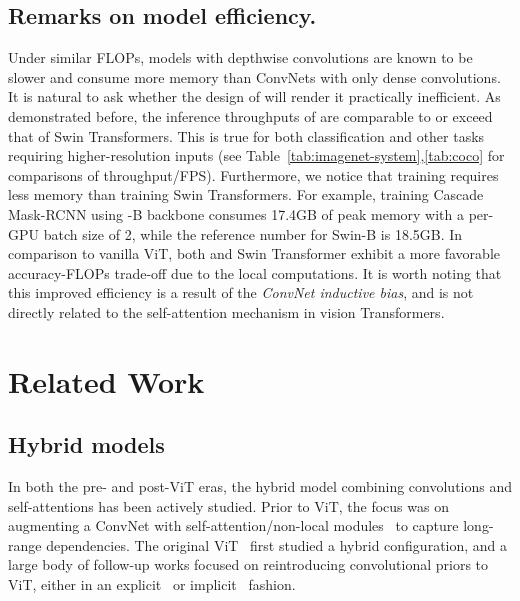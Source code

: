 \subsection{Remarks on model efficiency.} Under similar FLOPs, models with depthwise convolutions are known to be slower and consume more memory than ConvNets with only dense convolutions. It is natural to ask whether the design of \cnn{} will render it practically inefficient. As demonstrated before, the inference throughputs of  are comparable to or exceed that of Swin Transformers. This is true for both classification and other tasks requiring higher-resolution inputs (see Table~\ref{tab:imagenet-system},\ref{tab:coco} for comparisons of throughput/FPS). Furthermore, we notice that training  requires less memory than training Swin Transformers. For example, training Cascade Mask-RCNN using \cnn{}-B backbone consumes 17.4GB of peak memory with a per-GPU batch size of 2, while the reference number for Swin-B is 18.5GB.
In comparison to vanilla ViT, both \cnn{} and Swin Transformer exhibit a more favorable accuracy-FLOPs trade-off due to the local computations. It is worth noting that this improved efficiency is a result of the \emph{ConvNet inductive bias}, and is not directly related to the self-attention mechanism in vision Transformers.


\section{Related Work}
\subsection{Hybrid models} 
In both the pre- and post-ViT eras, the hybrid model combining convolutions and self-attentions has been actively studied. 
Prior to ViT, the focus was on augmenting a ConvNet with self-attention/non-local modules~\cite{Wang2018,bello2019attention,srinivas2021bottleneck,ramachandran2019stand} to capture long-range dependencies.
The original ViT~\cite{Dosovitskiy2021} first studied a hybrid configuration, and a large body of follow-up works focused on reintroducing convolutional priors to ViT, either in an explicit~\cite{wu2021cvt, xu2021co, d2021convit, dai2021coatnet,Xiao2021, fan2021multiscale} or implicit~\cite{Liu2021swin} fashion.

